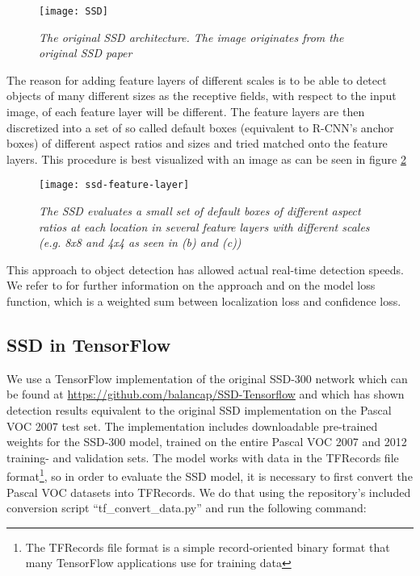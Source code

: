 \documentclass{article}
\begin{document}
\begin{figure}[h]
\centering
\texttt{[image: SSD]}
\caption{\textit{The original SSD architecture. The image originates from the original SSD paper \citep{SSD}}}
\label{fig:SSD}     
\end{figure} 

The reason for adding feature layers of different scales is to be able to detect objects of many different sizes as the receptive fields, with respect to the input image, of each feature layer will be different. The feature layers are then discretized into a set of so called default boxes (equivalent to R-CNN's anchor boxes) of different aspect ratios and sizes and tried matched onto the feature layers. This procedure is best visualized with an image as can be seen in figure \ref{fig:ssd-feature-layer}

\begin{figure}[h]
\centering
\texttt{[image: ssd-feature-layer]}
\caption{\textit{The SSD evaluates a small set of default boxes of different aspect ratios at each location in several feature layers with different scales (e.g. 8x8 and 4x4 as seen in (b) and (c))}}
\label{fig:ssd-feature-layer}     
\end{figure}    

This approach to object detection has allowed actual real-time detection speeds. 
We refer to \cite{SSD} for further information on the approach and on the model loss function, which is a weighted sum between localization loss and confidence loss. 
 
\subsection{SSD in TensorFlow}
\label{subsec:ssd-in-tensorflow}
We use a TensorFlow implementation of the original SSD-300 network which can be found at \url{https://github.com/balancap/SSD-Tensorflow} and which has shown detection results equivalent to the original SSD implementation on the Pascal VOC 2007 test set. 
The implementation includes downloadable pre-trained weights for the SSD-300 model, trained on the entire Pascal VOC 2007 and 2012 training- and validation sets. The model works with data in the TFRecords file format\footnote{The TFRecords file format is a simple record-oriented binary format that many TensorFlow applications use for training data}, so in order to evaluate the SSD model, it is necessary to first convert the Pascal VOC datasets into TFRecords. We do that using the repository's included conversion script ``tf\_convert\_data.py'' and run the following command: 
\end{document}
